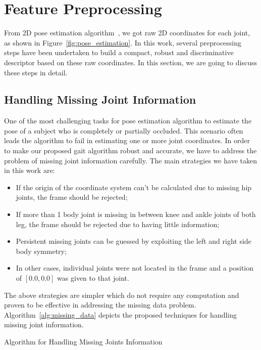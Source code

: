 \section{Feature Preprocessing}
From 2D pose estimation algorithm~\cite{Cao_19}, we got raw 2D coordinates for each joint, as shown in Figure~\ref{fig:pose_estimation}. In this work, several preprocessing steps have been undertaken to build a compact, robust and discriminative descriptor based on these raw coordinates. In this section, we are going to discuss these steps in detail.



\subsection{Handling Missing Joint Information}
One of the most challenging tasks for pose estimation algorithm to estimate the pose of a subject who is completely or partially occluded. This scenario often leads the algorithm to fail in estimating one or more joint coordinates. In order to make our proposed gait algorithm robust and accurate, we have to address the problem of missing joint information carefully. The main strategies we have taken in this work are: 

\begin{itemize}
\item If the origin of the coordinate system can't be calculated due to missing hip joints, the frame should be rejected;
\item If more than 1 body joint is missing in between knee and ankle joints of both leg, the frame should be rejected due to having little information;
\item Persistent missing joints can be guessed by exploiting the left and right side body symmetry;
\item In other cases, individual joints were not located in the frame and a position of $[0.0, 0.0]$ was given to that joint. 
\end{itemize}

The above strategies are simpler which do not require any computation and proven to be effective in addressing the missing data problem. Algorithm~\ref{alg:missing_data} depicts the proposed techniques for handling missing joint information.

\begin{algorithm}
	\caption{Algorithm for Handling Missing Joints Information}
	\label{alg:missing_data}
	\begin{algorithmic}
		
	\end{algorithmic}
\end{algorithm}

